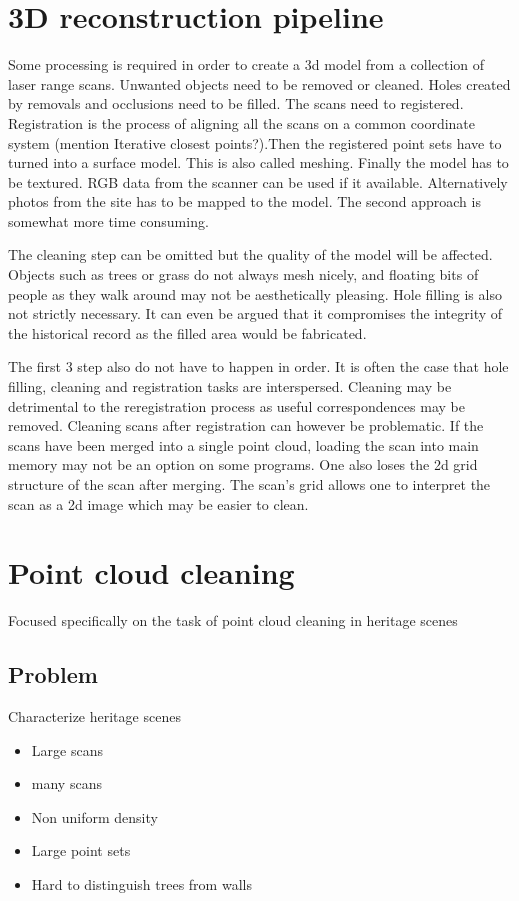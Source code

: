 \section{3D reconstruction pipeline}
Some processing is required in order to create a 3d model from a collection of laser range scans. Unwanted objects need to be removed or cleaned. Holes created by removals and occlusions need to be filled. The scans need to registered. Registration is the process of aligning all the scans on a common coordinate system (mention Iterative closest points?).Then the registered point sets have to turned into a surface model. This is also called meshing. Finally the model has to be textured. RGB data from the scanner can be used if it available. Alternatively photos from the site has to be mapped to the model. The second approach is somewhat more time consuming.

The cleaning step can be omitted but the quality of the model will be affected. Objects such as trees or grass do not always mesh nicely, and floating bits of people as they walk around may not be aesthetically pleasing. Hole filling is also not strictly necessary. It can even be argued that it compromises the integrity of the historical record as the filled area would be fabricated.

The first 3 step also do not have to happen in order. It is often the case that hole filling, cleaning and registration tasks are interspersed. Cleaning may be detrimental to the reregistration process as useful correspondences may be removed. Cleaning scans after registration can however be problematic. If the scans have been merged into a single point cloud, loading the scan into main memory may not be an option on some programs. One also loses the 2d grid structure of the scan after merging. The scan's grid allows one to interpret the scan as a 2d image which may be easier to clean.


\section{Point cloud cleaning}
	Focused specifically on the task of point cloud cleaning in heritage scenes

	\subsection{Problem}
	Characterize heritage scenes
	\begin{itemize}
		\item Large scans
		\item many scans
		\item Non uniform density
		\item Large point sets
		\item Hard to distinguish trees from walls
	\end{itemize}

